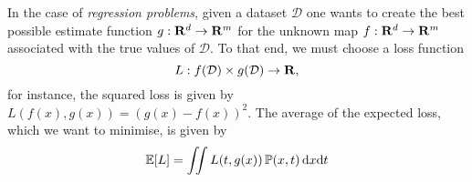 In the case of \emph{regression problems}, given a dataset \(\mathcal{D}\) one
wants to create the best possible estimate function \(g: \mathbf{R}^d \to \mathbf{R}^m\) for the
unknown map \(f: \mathbf{R}^d \to \mathbf{R}^m\) associated with the true values of
\(\mathcal{D}\). To that end, we must choose a loss function
\[
L: f(\mathcal{D}) \times g(\mathcal{D}) \to \mathbf{R},
\]
for instance, the squared loss is given by \(L(f(x), g(x)) = (g(x) -
f(x))^2\). The average of the expected loss, which we want to minimise, is given
by
\[
\operatorname{\mathbb{E}}[L] = \iint L(t, g(x)) \operatorname{\mathbb{P}}(x, t)\, \mathrm{d} x \mathrm{d} t
\]



